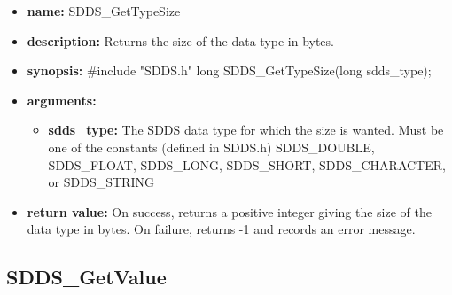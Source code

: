 \documentclass[11pt]{article}
\begin{document}
\begin{itemize}
\item {\bf name:}\newline
SDDS\_GetTypeSize
\item {\bf description:}\newline
Returns the size of the data type in bytes.
\item {\bf synopsis:} \#include "SDDS.h"\newline
long SDDS\_GetTypeSize(long sdds\_type);
\item {\bf arguments:}
\begin{itemize}
\item {\bf sdds\_type:} The SDDS data type for which the size is wanted. Must be one of the constants (defined in SDDS.h) SDDS\_DOUBLE, SDDS\_FLOAT, SDDS\_LONG, SDDS\_SHORT, SDDS\_CHARACTER, or SDDS\_STRING
\end{itemize}
\item {\bf return value:}\newline
On success, returns a positive integer giving the size of the data type in bytes. On failure, returns -1 and records an error message. 
\end{itemize}

\subsection{SDDS\_GetValue}
\label{SDDS_GetValue}
\end{document}

